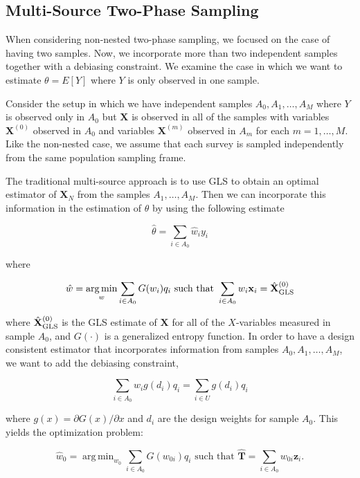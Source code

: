 \documentclass[12pt]{article}
\DeclareMathOperator*{\argmin}{arg\,min}
\renewcommand{\bf}[1]{\mathbf{#1}}
\begin{document}
\subsection{Multi-Source Two-Phase Sampling}

When considering non-nested two-phase sampling, we focused on the case of having
two samples. Now, we incorporate more than two independent samples
together with a debiasing constraint. We examine the case in which we
want to estimate $\theta = E[Y]$ where $Y$ is only observed in one sample.

Consider the setup in which we have independent samples $A_0, A_1, \dots, A_M$
where $Y$ is observed only in $A_0$ but $\bf X$ is observed in all of the
samples with variables $\bf X^{(0)}$ observed in $A_0$ and variables $\bf X^{(m)}$
observed in $A_m$ for each $m = 1, \dots, M$. Like the non-nested case, we
assume that each survey is sampled independently from the same population
sampling frame.

The traditional multi-source approach \citep{kim2024statistics} is to use
GLS to obtain an optimal estimator of $\bf X_N$ from the
samples $A_1, \dots, A_M$. Then we can incorporate this information in the
estimation of $\theta$ by using the following estimate 

$$\hat \theta = \sum_{i \in A_0} \hat w_i y_i$$

where 

\begin{equation}\label{eq:mstps}
\hat w = \argmin_w \sum_{i \in A_0} G(w_i)q_i \text{ such that } 
\sum_{i \in A_0} w_i \bf x_i = \hat{\bf X}_{\rm{GLS}}^{(0)}
\end{equation}

where $\hat{\bf X}_{\rm{GLS}}^{(0)}$ is the GLS estimate of $\bf X$ for all of
the $X$-variables measured in sample $A_0$, and $G(\cdot)$ is a generalized entropy
function. 
In order to have a design consistent estimator that incorporates information from
samples $A_0, A_1, \dots, A_M$, we want to add the debiasing constraint, 

\begin{equation}\label{eq:msdebconstr}
\sum_{i \in A_0} w_{i} g(d_i) q_i = \sum_{i \in U} g(d_i) q_i
\end{equation}

where $g(x) = \partial G(x) / \partial x$ and $d_i$ are the design weights for
sample $A_0$. This yields the optimization problem:

\begin{equation}\label{eq:dc3}
  \hat w_0 = \argmin_{w_0} \sum_{i \in A_0} G(w_{0i}) q_i \text{ such that }
  \widehat{\bf{T}} = \sum_{i \in A_0} w_{0i} \bf z_i.
\end{equation}
\end{document}
